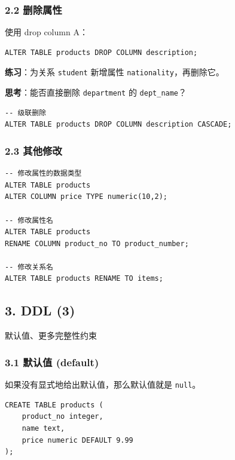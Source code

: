 \documentclass[aspectratio=169, 14pt]{beamer}
\begin{document}
\begin{frame}[fragile]
    \frametitle{2.2 删除属性}
    使用 \alert{drop column A}：
    \begin{verbatim}
ALTER TABLE products DROP COLUMN description; 
    \end{verbatim}    
\textbf{练习}：为关系 \texttt{student} 新增属性 \texttt{nationality}，再删除它。

\pause
\textbf{思考}：能否直接删除 \texttt{department} 的 \texttt{dept\_name}？

\pause
{}  

\begin{verbatim}
-- 级联删除
ALTER TABLE products DROP COLUMN description CASCADE;
\end{verbatim}  

\end{frame}

\begin{frame}[fragile]
    \frametitle{2.3 其他修改}
    \begin{verbatim}
-- 修改属性的数据类型
ALTER TABLE products 
ALTER COLUMN price TYPE numeric(10,2);

-- 修改属性名
ALTER TABLE products 
RENAME COLUMN product_no TO product_number;

-- 修改关系名
ALTER TABLE products RENAME TO items;
    \end{verbatim}

\end{frame}

\begin{frame}
    \section{\textcolor{darkmidnightblue}{3. DDL (3)}} 
    默认值、更多完整性约束

\end{frame}

\begin{frame}[fragile]
    \frametitle{3.1 默认值 (default)}
如果没有显式地给出默认值，那么默认值就是 \texttt{null}。

\begin{verbatim}
CREATE TABLE products (
    product_no integer,
    name text,
    price numeric DEFAULT 9.99
);
\end{verbatim}

\end{frame}
\end{document}
